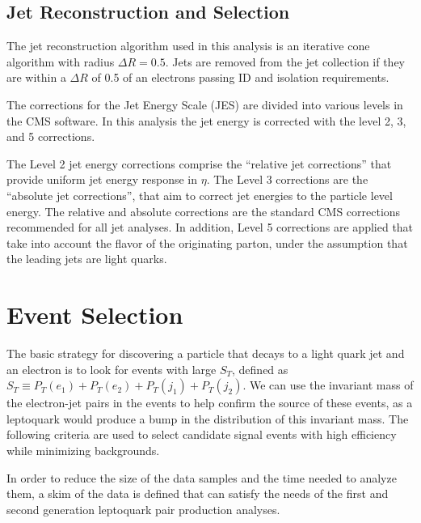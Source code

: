 \documentclass{cmspaper}
\begin{document}
\begin{linenumbers}
\subsection{Jet Reconstruction and Selection} \label{sec:jet}

The jet reconstruction algorithm used in this analysis is an 
iterative cone algorithm with radius $\Delta R=0.5$. %
Jets are removed   
from the jet collection if they are 
within a $\Delta R$ of 0.5 of an
electrons passing ID and isolation requirements.

The corrections for the Jet Energy Scale (JES) 
are divided into various levels in the CMS software. %
In this analysis the jet energy is corrected with the 
level 2, 3, and 5 corrections.

The Level 2 jet energy corrections comprise the 
``relative jet corrections'' that provide 
uniform jet energy response in $\eta$.  
The Level 3 corrections are the ``absolute jet corrections'', 
that aim to correct jet energies to the particle level energy. 
The relative and absolute corrections are the standard CMS 
corrections recommended for all jet analyses.
In addition, Level 5 corrections are applied that take into
account the flavor of the originating parton, under the assumption that the
leading jets are light quarks.

\section{Event Selection} \label{sec:eventSelection}
The basic strategy for discovering a 
particle that decays to a light quark jet and an electron 
is to look for events with large $S_T$, defined as
$S_T\equiv P_T(e_1)+P_T(e_2)+P_T(j_1)+P_T(j_2)$.
We can use
the invariant mass of the electron-jet pairs in the events to help
confirm the source of these events, as a leptoquark would produce 
a bump in the distribution of this invariant mass.
The following criteria are used to select candidate signal events
with high efficiency
while minimizing backgrounds.


In order to reduce the size of the data samples and the time 
needed to analyze them, a skim of the 
data is defined
that can satisfy the needs of the
first and second generation leptoquark pair production analyses.


\end{linenumbers}
\end{document}
